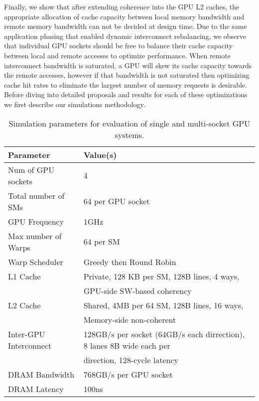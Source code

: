 Finally, we show that after extending coherence into the GPU L2 caches, the 
appropriate allocation of cache capacity between local memory bandwidth and 
remote memory bandwidth can not be decided at design time.  Due to the same 
application phasing that enabled dynamic interconnect rebalancing, we observe 
that individual GPU sockets should be free to balance their cache capacity 
between local and remote accesses to optimize performance.  When remote 
interconnect bandwidth is saturated, a GPU will skew its cache capacity towards 
the remote accesses,  however if that bandwidth is not saturated then optimizing 
cache hit rates to eliminate the largest number of memory requests is 
desirable. Before diving into detailed proposals and results for each of these 
optimizations we first describe our simulations methodology.

\begin{table}[tp]
\begin{small}
\centering
\begin{tabular}{ll}
\toprule
\textbf{Parameter} & \textbf{Value(s)} \\
\toprule
Num of GPU sockets & 4 \\
\midrule
Total number of SMs & 64 per GPU socket \\
\midrule
GPU Frequency & 1GHz \\
\midrule
Max number of Warps & 64 per SM \\
\midrule
Warp Scheduler & Greedy then Round Robin \\
\midrule
L1 Cache & Private, 128 KB per SM, 128B lines, 4 ways, \\ & GPU-side SW-based 
coherency \\
\midrule
L2 Cache & Shared, 4MB per 64 SM, 128B lines, 16 ways, \\ & Memory-side 
non-coherent\\
\midrule
Inter-GPU Interconnect & 128GB/s per socket (64GB/s each dirrection), 8 lanes 8B wide each per \\ & 
direction, 128-cycle latency \\
\midrule
DRAM Bandwidth & 768GB/s per GPU socket\\
\midrule
DRAM Latency & 100ns \\
\toprule
\end{tabular}
\caption{Simulation parameters for evaluation of single and multi-socket GPU 
systems.}
\label{tab:setup}
\end{small}
\end{table}

